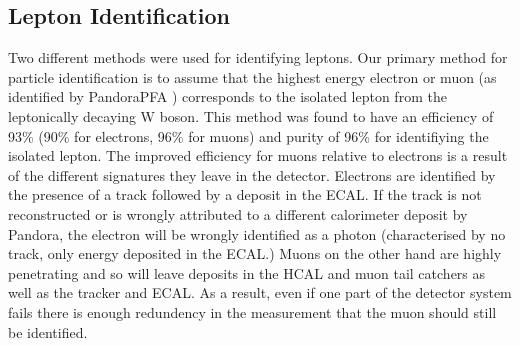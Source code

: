 \subsection{Lepton Identification}
Two different methods were used for identifying leptons. Our primary method for particle identification is to assume that the highest energy electron or muon (as identified by PandoraPFA \cite{Thomson200925}) corresponds to the isolated lepton from the leptonically decaying W boson. This method was found to have an efficiency of 93\% (90\% for electrons, 96\% for muons) and purity of 96\% for identifiying the isolated lepton. The improved efficiency for muons relative to electrons is a result of the different signatures they leave in the detector. Electrons are identified by the presence of a track followed by a deposit in the \ac{ECAL}. If the track is not reconstructed or is wrongly attributed to a different calorimeter deposit by Pandora, the electron will be wrongly identified as a photon (characterised by no track, only energy deposited in the \ac{ECAL}.) Muons on the other hand are highly penetrating and so will leave deposits in the \ac{HCAL} and muon tail catchers as well as the tracker and \ac{ECAL}. As a result, even if one part of the detector system fails there is enough redundency in the measurement that the muon should still be identified.



